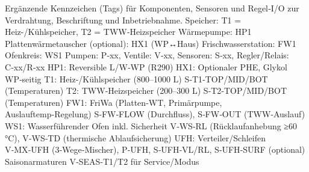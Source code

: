 \markdownRendererDocumentBegin
\markdownRendererSectionBegin
{}\markdownRendererInterblockSeparator
{}Ergänzende Kennzeichen (Tags) für Komponenten, Sensoren und Regel‑I/O zur Verdrahtung, Beschriftung und Inbetriebnahme.\markdownRendererInterblockSeparator
{}\markdownRendererSectionBegin
{}\markdownRendererInterblockSeparator
{}\markdownRendererUlBeginTight
\markdownRendererUlItem Speicher: T1 = Heiz-/Kühlspeicher, T2 = TWW‑Heizspeicher\markdownRendererUlItemEnd 
\markdownRendererUlItem Wärmepumpe: HP1\markdownRendererUlItemEnd 
\markdownRendererUlItem Plattenwärmetauscher (optional): HX1 (WP↔Haus)\markdownRendererUlItemEnd 
\markdownRendererUlItem Frischwasserstation: FW1\markdownRendererUlItemEnd 
\markdownRendererUlItem Ofenkreis: WS1\markdownRendererUlItemEnd 
\markdownRendererUlItem Pumpen: P‑xx, Ventile: V‑xx, Sensoren: S‑xx, Regler/Relais: C‑xx/R‑xx\markdownRendererUlItemEnd 
\markdownRendererUlEndTight \markdownRendererInterblockSeparator
{}
\markdownRendererSectionEnd \markdownRendererSectionBegin
{}\markdownRendererInterblockSeparator
{}\markdownRendererUlBeginTight
\markdownRendererUlItem HP1: Reversible L/W‑WP (R290)\markdownRendererUlItemEnd 
\markdownRendererUlItem HX1: Optionaler PHE, Glykol WP‑seitig\markdownRendererUlItemEnd 
\markdownRendererUlItem T1: Heiz-/Kühlspeicher (800–1000 L)\markdownRendererUlItemEnd 
\markdownRendererUlItem S‑T1‑TOP/MID/BOT (Temperaturen)\markdownRendererUlItemEnd 
\markdownRendererUlItem T2: TWW‑Heizspeicher (200–300 L)\markdownRendererUlItemEnd 
\markdownRendererUlItem S‑T2‑TOP/MID/BOT (Temperaturen)\markdownRendererUlItemEnd 
\markdownRendererUlItem FW1: FriWa (Platten‑WT, Primärpumpe, Auslauftemp‑Regelung)\markdownRendererUlItemEnd 
\markdownRendererUlItem S‑FW‑FLOW (Durchfluss), S‑FW‑OUT (TWW‑Auslauf)\markdownRendererUlItemEnd 
\markdownRendererUlItem WS1: Wasserführender Ofen inkl. Sicherheit\markdownRendererUlItemEnd 
\markdownRendererUlItem V‑WS‑RL (Rücklaufanhebung ≥60 °C), V‑WS‑TD (thermische Ablaufsicherung)\markdownRendererUlItemEnd 
\markdownRendererUlItem UFH: Verteiler/Schleifen\markdownRendererUlItemEnd 
\markdownRendererUlItem V‑MX‑UFH (3‑Wege‑Mischer), P‑UFH, S‑UFH‑VL/RL, S‑UFH‑SURF (optional)\markdownRendererUlItemEnd 
\markdownRendererUlItem Saisonarmaturen\markdownRendererUlItemEnd 
\markdownRendererUlItem V‑SEAS‑T1/T2 für Service/Modus\markdownRendererUlItemEnd 
\markdownRendererUlEndTight \markdownRendererInterblockSeparator
{}
\markdownRendererSectionEnd \markdownRendererSectionBegin
